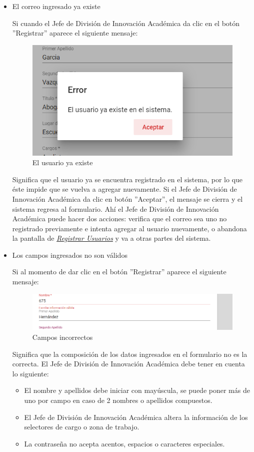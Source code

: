 \begin{itemize}
	\item El correo ingresado ya existe
	
	Si cuando el Jefe de División de Innovación Académica  da clic en el botón ''Registrar'' aparece el siguiente mensaje:
	
	\begin{figure}[H]
		\centering
		\includegraphics[width=0.4\linewidth]{images/SP5/MSG36}
		\caption{El usuario ya existe}
		\label{mensaje36}
		
	\end{figure}
	
	Significa que el usuario ya se encuentra registrado en el sistema, por lo que éste impide que se vuelva a agregar nuevamente. Si el Jefe de División de Innovación Académica  da clic en botón ''Aceptar'', el mensaje se cierra y el sistema regresa al formulario. Ahí el Jefe de División de Innovación Académica   puede hacer dos acciones: verifica que el correo sea uno no registrado previamente e intenta agregar al usuario nuevamente, o abandona la pantalla de \hyperlink{registrarUs}{\textit{Registrar Usuarios}} y va a otras partes del sistema.
	\newpage
	\item Los campos ingresados no son válidos
	
	Si al momento de dar clic en el botón ''Registrar'' aparece el siguiente mensaje:
	\begin{figure}[H]
		\centering
		\includegraphics[width=0.4\linewidth]{images/SP5/MSG35}
		\caption{Campos incorrectos}
		\label{mensaje35}
		
	\end{figure}
	
	Significa que la composición de los datos ingresados en el formulario no es la correcta. El Jefe de División de Innovación Académica  debe tener en cuenta lo siguiente:
	
	\begin{itemize}
		\item El nombre y apellidos debe iniciar con mayúscula, se puede poner más de uno por campo en caso de 2 nombres o apellidos compuestos.
		\item El Jefe de División de Innovación Académica  altera la información de los selectores de cargo o zona de trabajo.
		\item La contraseña no acepta acentos, espacios o caracteres especiales.
	\end{itemize}
	
\end{itemize}

